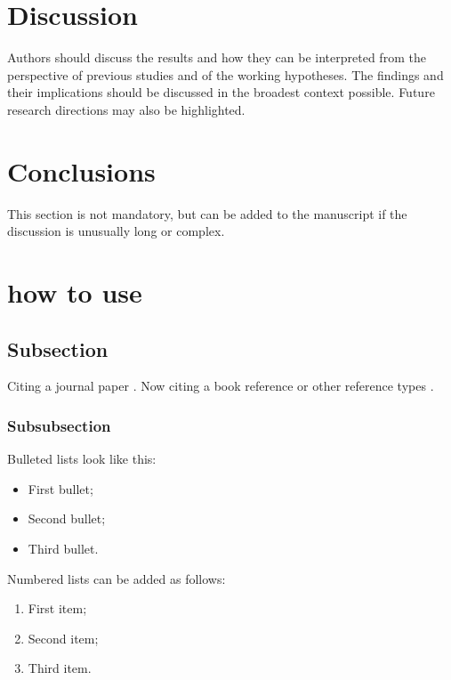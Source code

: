 \begin{paracol}{2}
\linenumbers
\switchcolumn





\section{Discussion}

Authors should discuss the results and how they can be interpreted from the perspective of previous studies and of the working hypotheses. The findings and their implications should be discussed in the broadest context possible. Future research directions may also be highlighted.

\section{Conclusions}

This section is not mandatory, but can be added to the manuscript if the discussion is unusually long or complex.

\section{how to use}

\subsection{Subsection}
Citing a journal paper \cite{wagner2017optimization} . Now citing a book reference \cite{blair2005sam} or other reference types \cite{hirsch2011standardization}. \cite{nellis_klein_2008}
\subsubsection{Subsubsection}

Bulleted lists look like this:
\begin{itemize}
\item	First bullet;
\item	Second bullet;
\item	Third bullet.
\end{itemize}

Numbered lists can be added as follows:
\begin{enumerate}
\item	First item; 
\item	Second item;
\item	Third item.
\end{enumerate}


\end{paracol}

